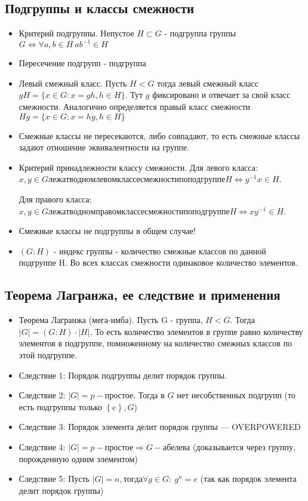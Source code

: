 \documentclass[11pt,a4paper]{article}
\begin{document}
		\subsection*{Подгруппы и классы смежности}
		\begin{itemize}
			\item Критерий подгруппы. Непустое $H \subset G$ - подгруппа группы $G \Leftrightarrow \forall a, b \in H \ ab^{-1} \in H$
			\item Пересечение подгрупп - подгруппа
			\item Левый смежный класс. Пусть $H < G$ тогда левый смежный класс $gH = \{x \in G : x = gh, h \in H\}$. Тут $g$ фиксировано и отвечает за свой класс смежности. Аналогично определяется правый класс смежности $Hg = \{x \in G: x = hg, h \in H\}$ 
			\item Смежные классы не пересекаются, либо совпадают, то есть смежные классы задают отношение эквивалентности на группе.
			\item Критерий принадлежности классу смежности. Для левого класса: $x, y \in G лежат в одном левом классе смежности по подгруппе H \Leftrightarrow y^{-1}x \in H$.
			
			Для правого класса: $x, y \in G лежат в одном правом классе смежности по подгруппе H \Leftrightarrow xy^{-1} \in H$.
			\item Смежные классы не подгруппы в общем случае!
			\item $\left(G : H\right)$ - индекс группы - количество смежные классов по данной подгруппе H. Во всех классах смежности одинаковое количество элементов. 
		\end{itemize}    
		
		\subsection*{Теорема Лагранжа, ее следствие и применения}
		\begin{itemize}
			\item Теорема Лагранжа (мега-имба). Пусть G - группа, $H < G$. Тогда $|G| = (G:H) \cdot |H|$. То есть количество элементов в группе равно количеству элементов в подгруппе, помноженному на количество смежных классов по этой подгруппе.
			\item Следствие 1: Порядок подгруппы делит порядок группы.
			\item Следствие 2: $|G| = p -\text{простое}$. Тогда в $G$ нет несобственных подгрупп (то есть подгруппы только $\left\{e\right\}, G$)
			\item Следствие 3: Порядок элемента делит порядок группы --- OVERPOWERED
			\item Следствие 4: $|G| = p - \text{простое} \Rightarrow G - \text{абелева}$ (доказывается через группу, порожденную одним элементом)
			\item Следствие 5: Пусть $|G| = n, тогда \forall g \in G: \ g^n = e$ (так как порядок элемента делит порядок группы)
		\end{itemize}
		
\end{document}
